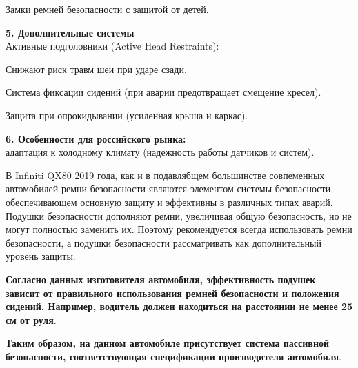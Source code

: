  Замки ремней безопасности с защитой от детей.
 
\textbf{ \textbf{5. Дополнительные системы}\\}
 Активные подголовники (Active Head Restraints):
 
 Снижают риск травм шеи при ударе сзади.
 
 Система фиксации сидений (при аварии предотвращает смещение кресел).
 
 Защита при опрокидывании (усиленная крыша и каркас).
 
\textbf{\textbf{ 6. Особенности для российского рынка}:\\}
 адаптация к холодному климату (надежность работы датчиков и систем).
 
 
  \par
 В Infiniti QX80 2019 года, как и в подавлябщем большинстве совпеменных автомобилей  ремни безопасности являются  элементом системы безопасности,  обеспечивающем основную защиту и эффективны в различных типах аварий. Подушки безопасности дополняют ремни, увеличивая общую безопасность, но не могут полностью заменить их. Поэтому рекомендуется всегда использовать ремни безопасности, а подушки безопасности рассматривать как дополнительный уровень защиты.
 
 \textbf{{Согласно данных изготовителя автомобиля, 
 		эффективность подушек зависит от правильного использования ремней безопасности и положения сидений. Например, водитель должен находиться на расстоянии не менее 25 см от руля}}.\\
 
 \vspace{3mm}
 
\textbf{ {Таким образом, на  данном автомобиле присутствует система пассивной безопасности, соответствующая спецификации производителя автомобиля}}.\\






 



